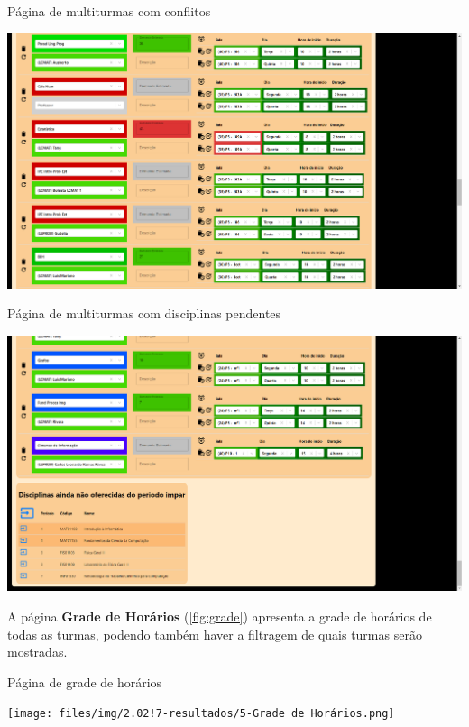 \begin{MyCenteredFigure} \caption{Página de multiturmas com conflitos} \label{fig:multiConflitos}
  \includegraphics[width=\textwidth]{files/img/2.02!7-resultados/3-Multiturmas-Conflitos.png}
\end{MyCenteredFigure}

\begin{MyCenteredFigure} \caption{Página de multiturmas com disciplinas pendentes} \label{fig:multiDisciplinas}
  \includegraphics[width=\textwidth]{files/img/2.02!7-resultados/4-Multiturmas-DisciplinasPendentes.png}
\end{MyCenteredFigure}

A página \textbf{Grade de Horários} (\autoref{fig:grade}) apresenta a grade de horários de todas as turmas, podendo também haver a filtragem de quais turmas serão mostradas.

\begin{MyCenteredFigure} \caption{Página de grade de horários} \label{fig:grade}
  \texttt{[image: files/img/2.02!7-resultados/5-Grade de Horários.png]}
\end{MyCenteredFigure}


